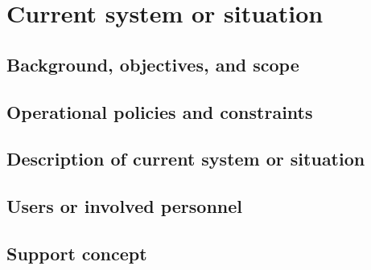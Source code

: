 
\chapter{Current system or situation}
\label{loc:Current System or Situation}


\section{Background, objectives, and scope}
\label{loc:Background, Objectives, and Scope}


\section{Operational policies and constraints}
\label{loc:Operational Policies and Constraints}


\section{Description of current system or situation}
\label{loc:Description of current system or situation}


\section{Users or involved personnel}
\label{loc:Users or involved personnel}


\section{Support concept}
\label{loc:Support concept}


